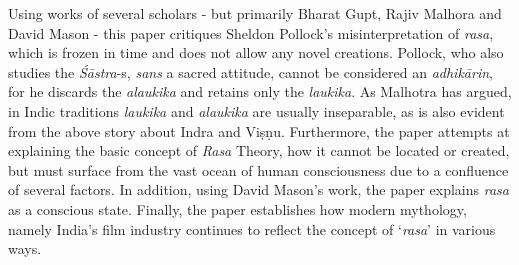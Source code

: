 Using works of several scholars - but primarily Bharat Gupt, Rajiv Malhora and David Mason - this paper critiques Sheldon Pollock’s misinterpretation of \textsl{rasa}, which is frozen in time and does not allow any novel creations. Pollock, who also studies the \textsl{Śāstra}-s, \textsl{sans} a sacred attitude, cannot be considered an \textsl{adhikārin}, for he discards the \textsl{alaukika} and retains only the \textsl{laukika}. As Malhotra has argued, in Indic traditions \textsl{laukika} and \textsl{alaukika} are usually inseparable, as is also evident from the above story about Indra and Viṣṇu. Furthermore, the paper attempts at explaining the basic concept of \textsl{Rasa} Theory, how it cannot be located or created, but must surface from the vast ocean of human consciousness due to a confluence of several factors. In addition, using David Mason’s work, the paper explains \textsl{rasa} as a conscious state. Finally, the paper establishes how modern mythology, namely India’s film industry continues to reflect the concept of ‘\textsl{rasa}' in various ways. 

